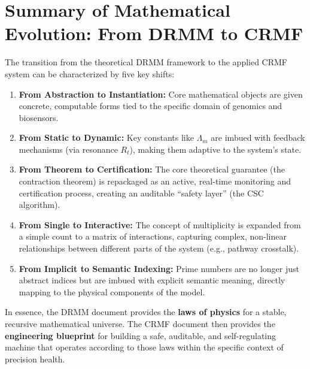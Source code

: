 \documentclass[12pt]{article}
\begin{document}
\section{Summary of Mathematical Evolution: From DRMM to CRMF}

The transition from the theoretical DRMM framework to the applied CRMF system can be characterized by five key shifts:

\begin{enumerate}
    \item \textbf{From Abstraction to Instantiation:} Core mathematical objects are given concrete, computable forms tied to the specific domain of genomics and biosensors.
    \item \textbf{From Static to Dynamic:} Key constants like $\Lambda_m$ are imbued with feedback mechanisms (via resonance $R_t$), making them adaptive to the system’s state.
    \item \textbf{From Theorem to Certification:} The core theoretical guarantee (the contraction theorem) is repackaged as an active, real-time monitoring and certification process, creating an auditable “safety layer” (the CSC algorithm).
    \item \textbf{From Single to Interactive:} The concept of multiplicity is expanded from a simple count to a matrix of interactions, capturing complex, non-linear relationships between different parts of the system (e.g., pathway crosstalk).
    \item \textbf{From Implicit to Semantic Indexing:} Prime numbers are no longer just abstract indices but are imbued with explicit semantic meaning, directly mapping to the physical components of the model.
\end{enumerate}

In essence, the DRMM document provides the \textbf{laws of physics} for a stable, recursive mathematical universe. The CRMF document then provides the \textbf{engineering blueprint} for building a safe, auditable, and self-regulating machine that operates according to those laws within the specific context of precision health.
\end{document}
